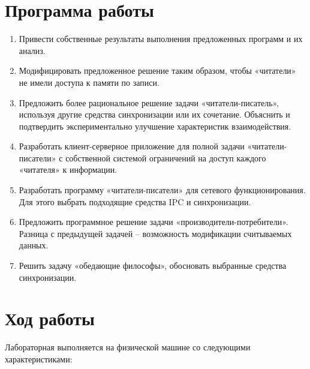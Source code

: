 \documentclass[a4paper]{article}
\begin{document}
\section{Программа работы}
\begin{enumerate}
\item Привести собственные результаты выполнения предложенных программ и  их анализ. 
\item Модифицировать предложенное решение таким образом, чтобы «читатели» не имели  доступа к памяти по записи. 
\item Предложить  более  рациональное  решение  задачи  «читатели-писатель»,  используя другие  средства  синхронизации  или  их  сочетание.  Объяснить  и  подтвердить экспериментально улучшение характеристик взаимодействия.
\item Разработать  клиент-серверное  приложение  для  полной задачи  «читатели-писатели»  с собственной системой ограничений на доступ каждого «читателя» к информации.
\item  Разработать  программу «читатели-писатели»  для  сетевого  функционирования.  Для этого выбрать подходящие средства IPC и  синхронизации.
\item Предложить  программное  решение  задачи  «производители-потребители».  Разница  с предыдущей задачей – возможность модификации считываемых данных.
\item Решить   задачу   «обедающие   философы», обосновать выбранные средства синхронизации.
\end{enumerate}

\section{Ход работы}
	Лабораторная выполняется на физической машине со следующими характеристиками:
	
\end{document}
